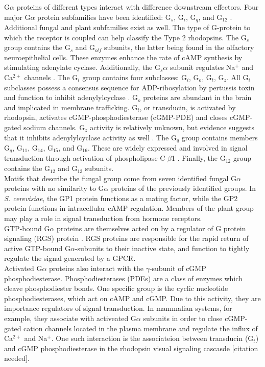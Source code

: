 \indent G$\alpha$ proteins of different types interact with difference downstream effectors. Four 
major G$\alpha$ protein subfamilies have been identified: G$_{s}$, G$_{i}$, G$_{q}$, and G$_{12}$ 
\cite{Hepler1992}. Additional fungal \cite{Bolker1998} and plant \cite{Ma1994} subfamilies exist 
as well. The type of G-protein to which the receptor is coupled can help classify the Type 2 
rhodopsins. The G$_{s}$ group contains the G$_{s}$ and G$_{olf}$  subunits, the latter being found 
in the olfactory neuroepithelial cells. These enzymes enhance the rate of cAMP synthesis by 
stimulating adenylate cyclase. Additionally, the G$_{s}\alpha$ subunit regulates Na$^{+}$ and 
Ca$^{2+}$ channels \cite{Hepler1992}. The G$_{i}$ group contains four subclasses: G$_{i}$, 
G$_{o}$, G$_{t}$, G$_{z}$. All G$_{i}$ subclasses possess a consensus sequence for 
ADP-ribosylation by pertussis toxin and function to inhibit adenylylcyclase \cite{KABMycotaIII}. 
G$_{o}$ proteins are abundant in the brain and implicated in membrane trafficking. 
G$_{t}$, or transducin, is activated by rhodopsin, activates cGMP-phosphodiesterase (cGMP-PDE) 
and closes cGMP-gated sodium channels. G$_{z}$ activity is relatively unknown, 
but evidence suggests that it inhibits adenylylcyclase activity as well \cite{KABMycotaIII}. 
The G$_{q}$ group contains members G$_{q}$, G$_{11}$, G$_{14}$, G$_{15}$, and G$_{16}$. 
These are widely expressed and involved in signal transduction through activation of phospholipase C-$\beta$1 \cite{KABMycotaIII}. 
Finally, the G$_{12}$ group contains the G$_{12}$ and G$_{13}$ subunits.\\

\indent Motifs that describe the fungal group come from seven identified fungal G$\alpha$ proteins with no similarity to G$\alpha$ proteins of the previously identified groups. In \textit{S. cerevisiae}, the GP1 protein functions as a mating factor, while the GP2 protein functions in intracellular cAMP regulation. Members of the plant group may play a role in signal transduction from hormone receptors.\\

\indent GTP-bound G$\alpha$ proteins are themselves acted on by a regulator of G protein signaling (RGS) protein \cite{DeVries2000}. RGS proteins are responsible for the rapid return of active GTP-bound G$\alpha$-subunits to their inactive state, and function to tightly regulate the signal generated by a GPCR. \\

\indent Activated G$\alpha$ proteins also interact with the $\gamma$-subunit of cGMP phosphodiesterase. Phosphodiesterases (PDEs) are a class of enzymes which cleave phosphodiester bonds. One specific group is the cyclic nucleotide phosphodiesterases, which act on cAMP and cGMP. Due to this activity, they are importance regulators of signal transduction. In mammalian systems, for example, they associate with activeated G$\alpha$ subunits in order to close cGMP-gated cation channels located in the plasma membrane and regulate the influx of Ca$^{2+}$ and Na$^{+}$. One such interaction is the associateion between transducin (G$_{t}$) and cGMP phosphodiesterase in the rhodopsin visual signaling cascasde [citation needed].\\

